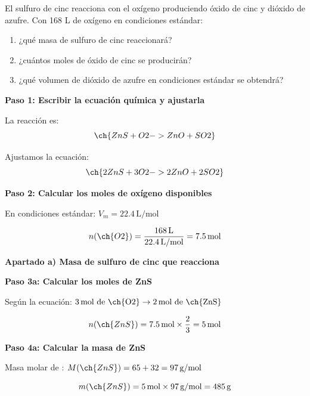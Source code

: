 \begin{exercise}
    El sulfuro de cinc reacciona con el oxígeno produciendo óxido de cinc y dióxido de azufre.
    Con 168 L de oxígeno en condiciones estándar:
    \begin{enumerate}[label=\letraminuscula]
    \item
    ¿qué masa de sulfuro de cinc reaccionará?
    \item
    ¿cuántos moles de óxido de cinc se producirán?
    \item
    ¿qué volumen de dióxido de azufre en condiciones estándar se obtendrá?
    \end{enumerate}
    \begin{solu}
        \textbf{Paso 1: Escribir la ecuación química y ajustarla}

        La reacción es:
        \begin{equation*}
            \ch{ZnS + O2 -> ZnO + SO2}
        \end{equation*}

        Ajustamos la ecuación:
        \begin{equation*}
            \ch{2 ZnS + 3 O2 -> 2 ZnO + 2 SO2}
        \end{equation*}

        \textbf{Paso 2: Calcular los moles de oxígeno disponibles}

        En condiciones estándar: $V_m = 22.4\,\text{L/mol}$

        \begin{equation*}
            n(\ch{O2}) = \frac{168\,\text{L}}{22.4\,\text{L/mol}} = 7.5\,\text{mol}
        \end{equation*}

        \textbf{Apartado a) Masa de sulfuro de cinc que reacciona}

        \textbf{Paso 3a: Calcular los moles de ZnS}

        Según la ecuación: $3\,\text{mol de \ch{O2}} \rightarrow 2\,\text{mol de \ch{ZnS}}$

        \begin{equation*}
            n(\ch{ZnS}) = 7.5\,\text{mol} \times \frac{2}{3} = 5\,\text{mol}
        \end{equation*}

        \textbf{Paso 4a: Calcular la masa de ZnS}

        Masa molar de : $M(\ch{ZnS}) = 65 + 32 = 97\,\text{g/mol}$

        \begin{equation*}
            m(\ch{ZnS}) = 5\,\text{mol} \times 97\,\text{g/mol} = 485\,\text{g}
        \end{equation*}


\end{solu}
\end{exercise}
